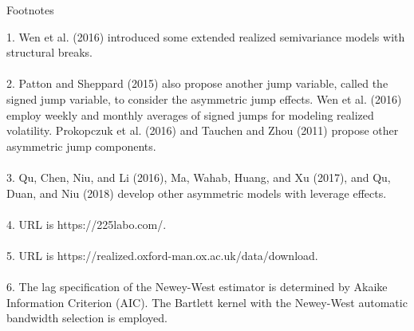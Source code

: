 \documentclass[10pt]{article}
\begin{document}
\newpage
\fontsize{10pt}{20pt}\selectfont
\begin{flushleft}
{\Large Footnotes}\\
\end{flushleft} 
1. Wen et al. (2016) introduced some extended realized semivariance models with structural breaks. 
\\
\\
2. Patton and Sheppard (2015) also propose another jump variable, called the signed jump variable, to consider the asymmetric jump effects.       
Wen et al. (2016) employ weekly and monthly averages of signed jumps for modeling realized volatility. 
Prokopczuk et al. (2016) and Tauchen and Zhou (2011) propose other asymmetric jump components. 
\\ 
\\
3. Qu, Chen, Niu, and Li (2016), Ma, Wahab, Huang, and Xu (2017), and Qu, Duan, and Niu (2018) develop other asymmetric models with leverage effects. 
\\ 
\\ 
4. URL is https://225labo.com/.  
\\ 
\\
5. URL is  https://realized.oxford-man.ox.ac.uk/data/download. 
\\
\\
6. The lag specification of the Newey-West estimator is determined by Akaike Information Criterion (AIC). 
The Bartlett kernel with the Newey-West automatic bandwidth selection is employed. 
\end{document}
